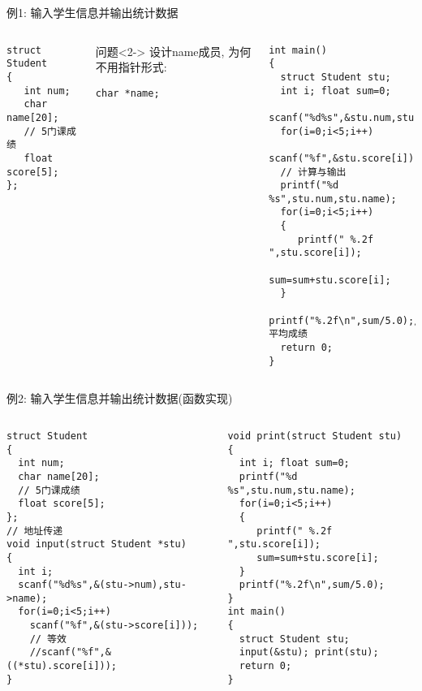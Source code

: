 \begin{frame}{例1: 输入学生信息并输出统计数据}
\vspace{-0.5cm}
\begin{columns}[T]
\begin{lstlisting}
struct Student 
{ 
   int num;
   char name[20];
   // 5门课成绩
   float score[5];
};
\end{lstlisting}
\begin{block}{问题}<2->
	设计name成员, 为何不用指针形式:
	
	\lstinline|char *name;| 
\end{block}
\begin{lstlisting}[frame=leftline]
int main()
{ 
  struct Student stu;
  int i; float sum=0;
  scanf("%d%s",&stu.num,stu.name);
  for(i=0;i<5;i++) 
     scanf("%f",&stu.score[i]); 
  // 计算与输出
  printf("%d %s",stu.num,stu.name);
  for(i=0;i<5;i++)
  { 
     printf(" %.2f ",stu.score[i]);
     sum=sum+stu.score[i];
  }
  printf("%.2f\n",sum/5.0);//平均成绩 
  return 0;
}
\end{lstlisting}
\end{columns}
\medskip
\end{frame}


\begin{frame}{例2: 输入学生信息并输出统计数据(函数实现)}
\vspace{-0.5cm}
\begin{columns}[T]
\begin{lstlisting}
struct Student 
{ 
  int num;
  char name[20];
  // 5门课成绩
  float score[5];
};
// 地址传递
void input(struct Student *stu)
{
  int i;
  scanf("%d%s",&(stu->num),stu->name);
  for(i=0;i<5;i++) 
    scanf("%f",&(stu->score[i])); 
    // 等效
    //scanf("%f",&((*stu).score[i]));
}
\end{lstlisting}
\begin{lstlisting}[frame=leftline]
void print(struct Student stu)
{
  int i; float sum=0;
  printf("%d %s",stu.num,stu.name);
  for(i=0;i<5;i++)
  { 
     printf(" %.2f ",stu.score[i]);
     sum=sum+stu.score[i];
  }
  printf("%.2f\n",sum/5.0);
}
int main()
{ 
  struct Student stu;
  input(&stu); print(stu); 
  return 0;
}
\end{lstlisting}
\end{columns}
\medskip
\end{frame}

